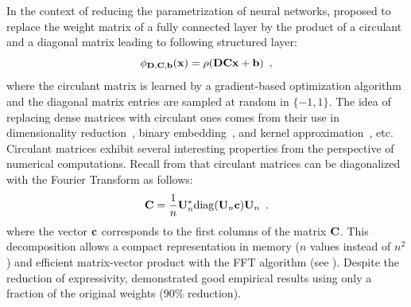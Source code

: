 In the context of reducing the parametrization of neural networks, \citet{cheng2015exploration} proposed to replace the weight matrix of a fully connected layer by the product of a circulant and a diagonal matrix leading to following structured layer:
\begin{equation}
  \layer_{\Dmat, \Cmat, \bvec} (\xvec) = \act \left( \Dmat \Cmat \xvec + \bvec \right) \enspace,
\end{equation}
where the circulant matrix is learned by a gradient-based optimization algorithm and the diagonal matrix entries are sampled at random in $\{-1, 1\}$. 
The idea of replacing dense matrices with circulant ones comes from their use in dimensionality reduction~\cite{hinrichs2011johnson,vybiral2011variant}, binary embedding~\cite{yu2014circulant}, and kernel approximation~\cite{yu2015compact}, etc.
Circulant matrices exhibit several interesting properties from the perspective of numerical computations.
Recall from  that circulant matrices can be diagonalized with the Fourier Transform as follows:
\begin{equation}
  \mathbf{C} = \frac{1}{n} \mathbf{U}_n^* \mathrm{diag}(\mathbf{U}_n \mathbf{c}) \mathbf{U}_n \enspace.
\end{equation}
where the vector $\mathbf{c}$ corresponds to the first columns of the matrix $\mathbf{C}$.
This decomposition allows a compact representation in memory ($n$ values instead of $n^2$) and efficient matrix-vector product with the FFT algorithm (see ).
Despite the reduction of expressivity, \citet{cheng2015exploration} demonstrated good empirical results using only a fraction of the original weights (90\% reduction). 


